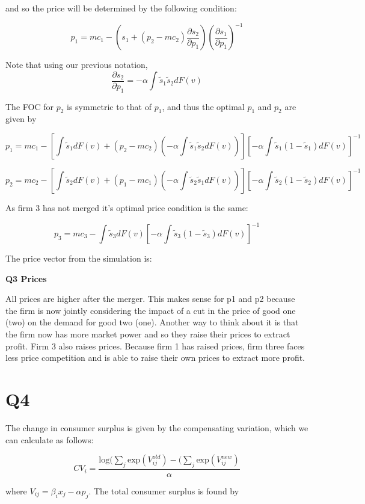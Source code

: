 \documentclass{article}
\newcommand{\1}{\mathbbm{1}}
\begin{document}
and so the price will be determined by the following condition:

$$p_1 = mc_1 - (s_1 + (p_2 - mc_2)\frac{\partial s_2}{\partial p_1})(\frac{\partial s_1}{\partial p_1})^{-1}$$

Note that using our previous notation,
$$\frac{\partial s_2}{\partial p_1} = - \alpha \int \tilde{s}_1\tilde{s}_2dF(v)$$

The FOC for $p_2$ is symmetric to that of $p_1$, and thus the optimal $p_1$ and $p_2$ are given by

$$p_1 = mc_1 - [\int \tilde{s}_1 dF(v) + (p_2 - mc_2)(- \alpha \int \tilde{s}_1\tilde{s}_2dF(v))][-\alpha \int \tilde{s}_1(1-\tilde{s}_1)dF(v)]^{-1}$$


$$p_2 = mc_2 - [\int \tilde{s}_2 dF(v) + (p_1 - mc_1)(- \alpha \int \tilde{s}_2\tilde{s}_1dF(v))][-\alpha \int \tilde{s}_2(1-\tilde{s}_2)dF(v)]^{-1}$$

As firm 3 has not merged it's optimal price condition is the same:

$$p_3 = mc_3 - \int \tilde{s}_3 dF(v)[ -\alpha \int \tilde{s}_3(1-\tilde{s}_3)dF(v)]^{-1}$$

The price vector from the simulation is: 

\begin{center}
	\centering
	\textbf{Q3 Prices}\par\medskip
	\scalebox{1}{
		
	}
\end{center}

All prices are higher after the merger. This makes sense for p1 and p2 because the firm is now jointly considering the impact of a cut in the price of good one (two) on the demand for good two (one). Another way to think about it is that the firm now has more market power and so they raise their prices to extract profit. Firm 3 also raises prices. Because firm 1 has raised prices, firm three faces less price competition and is able to raise their own prices to extract more profit. 

\section{Q4}
The change in consumer surplus is given by the compensating variation, which we can calculate as follows:

$$CV_i = \frac{\text{log}(\sum_j \text{exp}(V_{ij}^{old}) - (\sum_j \text{exp}(V_{ij}^{new})}{\alpha}$$

where $V_{ij} = \beta_ix_j - \alpha p_j$. The total consumer surplus is found by 
\end{document}
